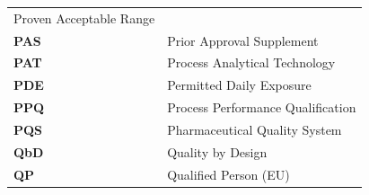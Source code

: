 \documentclass[
  11pt,
  a4paper,
]{report}
\begin{document}
\begin{longtable}[]{@{}ll@{}}
\begin{minipage}[t]{0.61\columnwidth}
Proven Acceptable Range\strut
\end{minipage}\tabularnewline
\begin{minipage}[t]{0.33\columnwidth}\raggedright
\textbf{PAS}\strut
\end{minipage} & \begin{minipage}[t]{0.61\columnwidth}\raggedright
Prior Approval Supplement\strut
\end{minipage}\tabularnewline
\begin{minipage}[t]{0.33\columnwidth}\raggedright
\textbf{PAT}\strut
\end{minipage} & \begin{minipage}[t]{0.61\columnwidth}\raggedright
Process Analytical Technology\strut
\end{minipage}\tabularnewline
\begin{minipage}[t]{0.33\columnwidth}\raggedright
\textbf{PDE}\strut
\end{minipage} & \begin{minipage}[t]{0.61\columnwidth}\raggedright
Permitted Daily Exposure\strut
\end{minipage}\tabularnewline
\begin{minipage}[t]{0.33\columnwidth}\raggedright
\textbf{PPQ}\strut
\end{minipage} & \begin{minipage}[t]{0.61\columnwidth}\raggedright
Process Performance Qualification\strut
\end{minipage}\tabularnewline
\begin{minipage}[t]{0.33\columnwidth}\raggedright
\textbf{PQS}\strut
\end{minipage} & \begin{minipage}[t]{0.61\columnwidth}\raggedright
Pharmaceutical Quality System\strut
\end{minipage}\tabularnewline
\begin{minipage}[t]{0.33\columnwidth}\raggedright
\textbf{QbD}\strut
\end{minipage} & \begin{minipage}[t]{0.61\columnwidth}\raggedright
Quality by Design\strut
\end{minipage}\tabularnewline
\begin{minipage}[t]{0.33\columnwidth}\raggedright
\textbf{QP}\strut
\end{minipage} & \begin{minipage}[t]{0.61\columnwidth}\raggedright
Qualified Person (EU)\strut
\end{minipage}\tabularnewline

\end{longtable}
\end{document}
